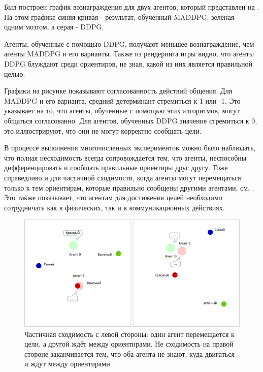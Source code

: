 Был построен график вознаграждения для двух агентов, который представлен на . На этом графике синяя кривая - результат, обученный MADDPG, зелёная - одним мозгом, а серая - DDPG.

Агенты, обученные с помощью DDPG, получают меньшее вознаграждение, чем агенты MADDPG и его варианты. Также из рендеринга игры видно, что агенты DDPG блуждают среди ориентиров, не зная, какой из них является правильной целью.

Графики на рисунке  показывают согласованность действий общения. Для MADDPG и его варианта, средний детерминант стремиться к 1 или -1. Это указывает на то, что агенты, обученные с помощью этих алгоритмов, могут общаться согласованно. Для агентов, обученных DDPG значение стремиться к 0, это иллюстрируют, что они не могут корректно сообщать цели.

В процессе выполнения многочисленных экспериментов можно было наблюдать, что полная несходимость всегда сопровождается тем, что агенты, неспособны дифференцировать и сообщать правильные ориентиры друг другу. Тоже справедливо и для частичной сходимости, когда агенты могут перемещаться только к тем ориентирам, которые правильно сообщены другими агентами, см. . Это также показывает, что агентам для достижения целей необходимо сотрудничать как в физических, так и в коммуникационных действиях.

\begin{figure}[ht!]
	\center
	\includegraphics [scale=0.45] {my_folder/images/ch5/results-sr-non-convergency.png}
	\caption{Частичная сходимость с левой стороны: один агент перемещается к цели, а другой ждёт между ориентирами. Не сходимость на правой стороне заканчивается тем, что оба агента не знают, куда двигаться и ждут между ориентирами}
	\label{fig:result-sr-non-convergency}
\end{figure}

